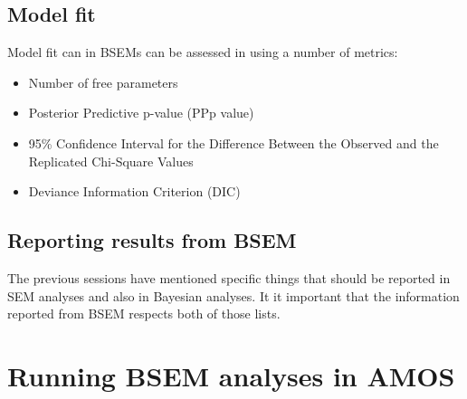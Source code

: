 \documentclass[
]{book}
\providecommand{\tightlist}{%
  \setlength{\itemsep}{0pt}\setlength{\parskip}{0pt}}
\begin{document}
\section{Model fit}\label{model-fit}

Model fit can in BSEMs can be assessed in using a number of metrics:

\begin{itemize}
\tightlist
\item
  Number of free parameters
\item
  Posterior Predictive p-value (PPp value)
\item
  95\% Confidence Interval for the Difference Between the Observed and the Replicated Chi-Square Values
\item
  Deviance Information Criterion (DIC)
\end{itemize}

\section{Reporting results from BSEM}\label{reporting-results-from-bsem}

The previous sessions have mentioned specific things that should be reported in SEM analyses and also in Bayesian analyses. It it important that the information reported from BSEM respects both of those lists.

\chapter{Running BSEM analyses in AMOS}\label{running-bsem-analyses-in-amos}
\end{document}
